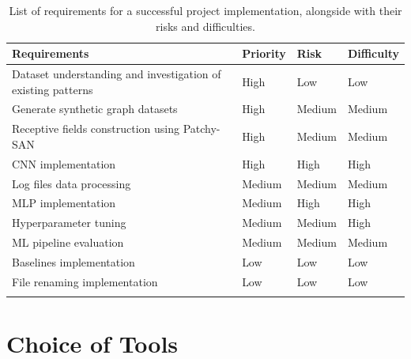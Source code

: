 \begin{longtable}{|p{}|p{}|p{}|p{}|}
  \hline
  \textbf{Requirements}                                        & \textbf{Priority} & \textbf{Risk} & \textbf{Difficulty} \\
  \hline
  Dataset understanding and investigation of existing patterns & High              & Low           & Low                 \\

  Generate synthetic graph datasets                                      & High            & Medium        & Medium              \\
  
  Receptive fields construction using Patchy-SAN               & High              & Medium           & Medium              \\

  CNN implementation                                           & High              & High        & High                \\


  Log files data processing                                   & Medium       & Medium & Medium \\
  
  MLP implementation                                       & Medium           & High          & High \\
  Hyperparameter tuning                                        & Medium            & Medium        & High                \\

  ML pipeline evaluation                          & Medium            & Medium        & Medium              \\
  
  Baselines implementation                       & Low               & Low        & Low              \\
  File renaming implementation               & Low               & Low        & Low              \\

  \hline
  \caption[Requirements overview]{List of requirements for a successful project implementation, alongside with their risks and difficulties.}
  \label{Requirements overview}
\end{longtable} 


\section{Choice of Tools}

